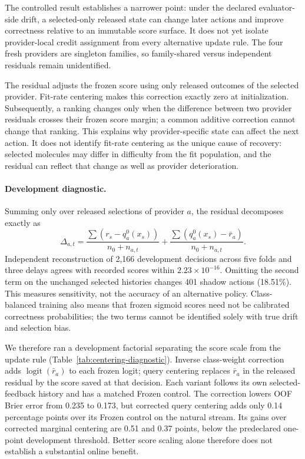 \documentclass[sigconf,anonymous]{aamas}
\begin{document}
The controlled result establishes a narrower point: under the declared evaluator-side drift, a selected-only released state can change later actions and improve correctness relative to an immutable score surface. It does not yet isolate provider-local credit assignment from every alternative update rule. The four fresh providers are singleton families, so family-shared versus independent residuals remain unidentified.

The residual adjusts the frozen score using only released outcomes of the selected provider. Fit-rate centering makes this correction exactly zero at initialization. Subsequently, a ranking changes only when the difference between two provider residuals crosses their frozen score margin; a common additive correction cannot change that ranking. This explains why provider-specific state can affect the next action. It does not identify fit-rate centering as the unique cause of recovery: selected molecules may differ in difficulty from the fit population, and the residual can reflect that change as well as provider deterioration.

\paragraph{Development diagnostic.}
Summing only over released selections of provider $a$, the residual decomposes exactly as
\begin{equation}
\Delta_{a,t}=\frac{\sum(r_s-q_a^0(x_s))}{n_0+n_{a,t}}
            +\frac{\sum(q_a^0(x_s)-\bar r_a)}{n_0+n_{a,t}}.
\end{equation}
Independent reconstruction of 2,166 development decisions across five folds and three delays agrees with recorded scores within $2.23\times10^{-16}$. Omitting the second term on the unchanged selected histories changes 401 shadow actions (18.51\%). This measures sensitivity, not the accuracy of an alternative policy. Class-balanced training also means that frozen sigmoid scores need not be calibrated correctness probabilities; the two terms cannot be identified solely with true drift and selection bias.

We therefore ran a development factorial separating the score scale from the update rule (Table~\ref{tab:centering-diagnostic}). Inverse class-weight correction adds $\operatorname{logit}(\bar r_a)$ to each frozen logit; query centering replaces $\bar r_a$ in the released residual by the score saved at that decision. Each variant follows its own selected-feedback history and has a matched Frozen control. The correction lowers OOF Brier error from 0.235 to 0.173, but corrected query centering adds only 0.14 percentage points over its Frozen control on the natural stream. Its gains over corrected marginal centering are 0.51 and 0.37 points, below the predeclared one-point development threshold. Better score scaling alone therefore does not establish a substantial online benefit.
\end{document}
